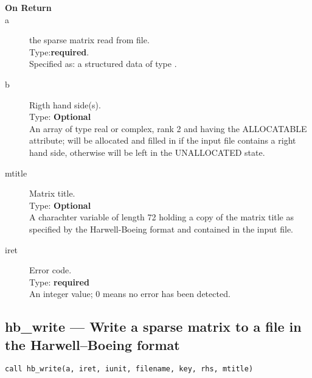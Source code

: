 \begin{description}
\item[\bf On Return]
\item[a] the sparse matrix read from file.\\
Type:{\bf required}.\\
Specified as: a structured data of type \spdata.
\item[b] Rigth hand side(s).\\
Type: {\bf Optional} \\
An  array of type real or complex, rank 2 and having the ALLOCATABLE
attribute; will be allocated and filled in if the input file contains
a right hand side, otherwise will be left in the UNALLOCATED state. 
\item[mtitle] Matrix title.\\
Type: {\bf Optional} \\
A charachter variable of length 72 holding a copy of the
matrix title as specified by the Harwell-Boeing format and contained
in the input file.
\item[iret] Error code.\\
Type: {\bf required} \\
An integer value; 0 means no error has been detected. 
\end{description}



\clearpage\subsection{hb\_write --- Write a sparse matrix to a  file
  in the Harwell--Boeing format}


\begin{lstlisting}
call hb_write(a, iret, iunit, filename, key, rhs, mtitle)
\end{lstlisting}



